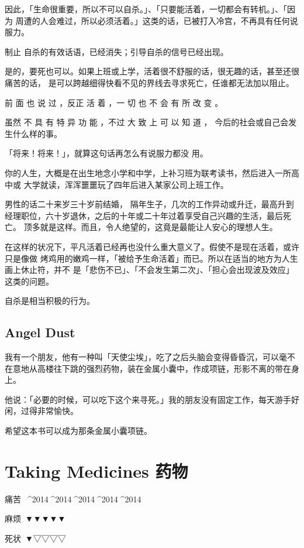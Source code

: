 \documentclass[UTF8]{ctexart}
\begin{document}
因此，「生命很重要，所以不可以自杀。」、「只要能活着，一切都会有转机。」、「因为 周遭的人会难过，所以必须活着。」这类的话，已被打入冷宫，不再具有任何说服力。

制止 自杀的有效话语，已经消失；引导自杀的信号已经出现。

是的，要死也可以。如果上班或上学，活着很不舒服的话，很无趣的话，甚至还很痛苦的话， 是可以跨越细得快看不见的界线去寻求死亡，任谁都无法加以阻止。

前 面 也 说 过 ，反正 活 着 ，一 切 也 不 会 有 所 改 变 。

虽然 不 具 有 特 异 功 能 ，不过 大 致 上 可 以 知 道 ， 今后的社会或自己会发生什么样的事。

「将来！将来！」，就算这句话再怎么有说服力都没 用。

你的人生，大概是在出生地念小学和中学，上补习班为联考读书，然后进入一所高中或 大学就读，浑浑噩噩玩了四年后进入某家公司上班工作。

男性的话二十来岁三十岁前结婚， 隔年生子，几次的工作异动或升迁，最高升到经理职位，六十岁退休，之后的十年或二十年过着享受自己兴趣的生活，最后死亡。
顶多就是这样。而且，令人绝望的，这竟是最能让人安心的理想人生。 

在这样的状况下，平凡活着已经再也没什么重大意义了。假使不是现在活着，或许只是像做 烤鸡用的嫩鸡一样，「被给予生命活着」而已。所以在适当的地方为人生画上休止符，并不 是「悲伤不已」、「不会发生第二次」、「担心会出现波及效应」这类的问题。

自杀是相当积极的行为。

\subsection{Angel Dust}

我有一个朋友，他有一种叫「天使尘埃」，吃了之后头脑会变得昏昏沉，可以毫不在意地从高楼往下跳的强烈药物，装在金属小囊中，作成项链，形影不离的带在身上。

他说：「必要的时候，可以吃下这个来寻死。」我的朋友没有固定工作，每天游手好闲，过得非常愉快。

希望这本书可以成为那条金属小囊项链。

\section{Taking Medicines 药物}

痛苦\ ^^^^2014^^^^2014^^^^2014^^^^2014^^^^2014

麻烦\ ▼▼▼▼▼

死状\ ▼▽▽▽▽
\end{document}
